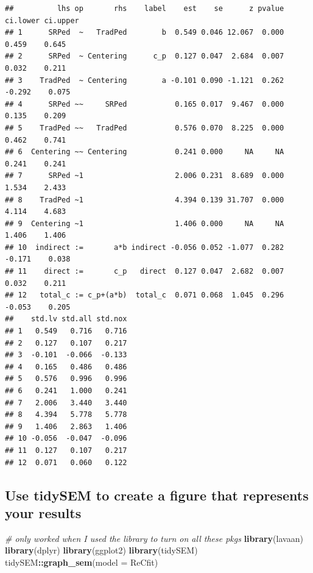 \documentclass[
  11pt,
]{book}
\newenvironment{Shaded}{\begin{snugshade}}{\end{snugshade}}
\newcommand{\AttributeTok}[1]{\textcolor[rgb]{0.27,0.27,0.27}{#1}}
\newcommand{\CommentTok}[1]{\textcolor[rgb]{0.37,0.37,0.37}{\textit{#1}}}
\newcommand{\FunctionTok}[1]{\textcolor[rgb]{0.27,0.27,0.27}{\textbf{#1}}}
\newcommand{\NormalTok}[1]{#1}
\newcommand{\SpecialCharTok}[1]{\textcolor[rgb]{0.43,0.43,0.43}{\textbf{#1}}}
\begin{document}
\begin{verbatim}
##          lhs op       rhs    label    est    se      z pvalue ci.lower ci.upper
## 1      SRPed  ~   TradPed        b  0.549 0.046 12.067  0.000    0.459    0.645
## 2      SRPed  ~ Centering      c_p  0.127 0.047  2.684  0.007    0.032    0.211
## 3    TradPed  ~ Centering        a -0.101 0.090 -1.121  0.262   -0.292    0.075
## 4      SRPed ~~     SRPed           0.165 0.017  9.467  0.000    0.135    0.209
## 5    TradPed ~~   TradPed           0.576 0.070  8.225  0.000    0.462    0.741
## 6  Centering ~~ Centering           0.241 0.000     NA     NA    0.241    0.241
## 7      SRPed ~1                     2.006 0.231  8.689  0.000    1.534    2.433
## 8    TradPed ~1                     4.394 0.139 31.707  0.000    4.114    4.683
## 9  Centering ~1                     1.406 0.000     NA     NA    1.406    1.406
## 10  indirect :=       a*b indirect -0.056 0.052 -1.077  0.282   -0.171    0.038
## 11    direct :=       c_p   direct  0.127 0.047  2.682  0.007    0.032    0.211
## 12   total_c := c_p+(a*b)  total_c  0.071 0.068  1.045  0.296   -0.053    0.205
##    std.lv std.all std.nox
## 1   0.549   0.716   0.716
## 2   0.127   0.107   0.217
## 3  -0.101  -0.066  -0.133
## 4   0.165   0.486   0.486
## 5   0.576   0.996   0.996
## 6   0.241   1.000   0.241
## 7   2.006   3.440   3.440
## 8   4.394   5.778   5.778
## 9   1.406   2.863   1.406
## 10 -0.056  -0.047  -0.096
## 11  0.127   0.107   0.217
## 12  0.071   0.060   0.122
\end{verbatim}

\hypertarget{use-tidysem-to-create-a-figure-that-represents-your-results}{%
\subsection*{Use tidySEM to create a figure that represents your results}\label{use-tidysem-to-create-a-figure-that-represents-your-results}}


\begin{Shaded}
\begin{Highlighting}[]
\CommentTok{\# only worked when I used the library to turn on all these pkgs}
\FunctionTok{library}\NormalTok{(lavaan)}
\FunctionTok{library}\NormalTok{(dplyr)}
\FunctionTok{library}\NormalTok{(ggplot2)}
\FunctionTok{library}\NormalTok{(tidySEM)}
\NormalTok{tidySEM}\SpecialCharTok{::}\FunctionTok{graph\_sem}\NormalTok{(}\AttributeTok{model =}\NormalTok{ ReCfit)}
\end{Highlighting}
\end{Shaded}
\end{document}
